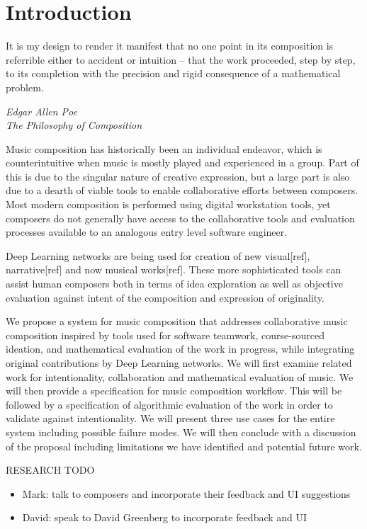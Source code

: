 \documentclass[final,authoryear,11pt,times]{elsarticle}
\begin{document}
\section{Introduction}
\label{sec:introduction}


\epigraph{It is my design to render it manifest that no one point in its composition is referrible either to accident or intuition -- that the work proceeded, step by step, to its completion with the precision and rigid consequence of a mathematical problem.}{\textit{Edgar Allen Poe \\ The Philosophy of Composition}}

Music composition has historically been an individual endeavor, which is counterintuitive when music is
mostly played and experienced in a group. Part of this is due to the singular nature of creative 
expression, but a large part is also due to a dearth of viable tools to enable collaborative efforts
between composers. Most modern composition is performed using digital workstation tools, yet composers do not generally
have access to the collaborative tools and evaluation processes available to an analogous entry level software engineer.

Deep Learning networks are being used for creation of new visual[ref], narrative[ref] and now musical works[ref].
These more sophisticated tools can assist human composers both in terms of idea exploration as well as 
objective evaluation against intent of the composition and expression of originality.

We propose a system for music composition that addresses collaborative music composition inspired by
tools used for software teamwork, course-sourced ideation, and mathematical evaluation of the work in progress,
while integrating original contributions by Deep Learning networks.
We will first examine related work for intentionality, collaboration and mathematical evaluation of music.  We will
then provide a specification for music composition workflow. This will be
followed by a specification of algorithmic evaluation of the work in order to validate against intentionality.
We will present three use cases for the entire system including possible failure modes. We will then 
conclude with a discussion of the proposal including limitations we have identified and potential future work.


RESEARCH TODO
\begin{itemize}
\item Mark: talk to composers and incorporate their feedback and UI suggestions
\item David: speak to David Greenberg to incorporate feedback and UI
\end{itemize}
\end{document}
